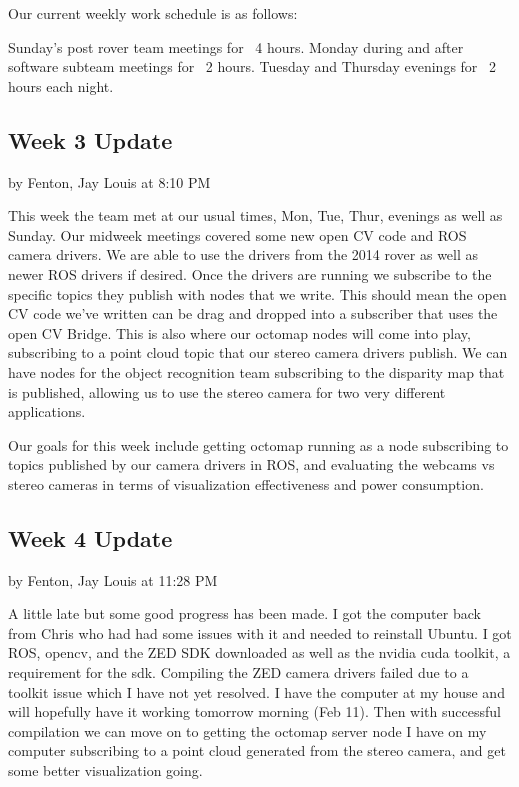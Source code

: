 \documentclass[10pt, oneside,onecolumn]{IEEEtran}
\begin{document}
\begin{titlepage}
Our current weekly work schedule is as follows:

Sunday's post rover team meetings for ~4 hours.
Monday during and after software subteam meetings for ~2 hours.
Tuesday and Thursday evenings for ~2 hours each night. 

\subsection{Week 3 Update}
by Fenton, Jay Louis at 8:10 PM

This week the team met at our usual times, Mon, Tue, Thur, evenings as well as Sunday. Our midweek meetings covered some new open CV code and ROS camera drivers. We are able to use the drivers from the 2014 rover as well as newer ROS drivers if desired. Once the drivers are running we subscribe to the specific topics they publish with nodes that we write. This should mean the open CV code we've written can be drag and dropped into a subscriber that uses the open CV Bridge. This is also where our octomap nodes will come into play, subscribing to a point cloud topic that our stereo camera drivers publish. We can have nodes for the object recognition team subscribing to the disparity map that is published, allowing us to use the stereo camera for two very different applications. 

Our goals for this week include getting octomap running as a node subscribing to topics published by our camera drivers in ROS, and evaluating the webcams vs stereo cameras in terms of visualization effectiveness and power consumption.

\subsection{Week 4 Update}
by Fenton, Jay Louis at 11:28 PM 

A little late but some good progress has been made. I got the computer back from Chris who had had some issues with it and needed to reinstall Ubuntu. I got ROS, opencv, and the ZED SDK downloaded as well as the nvidia cuda toolkit, a requirement for the sdk. Compiling the ZED camera drivers failed due to a toolkit issue which I have not yet resolved. I have the computer at my house and will hopefully have it working tomorrow morning (Feb 11). Then with successful compilation we can move on to getting the octomap server node I have on my computer subscribing to a point cloud generated from the stereo camera, and get some better visualization going. 


\end{titlepage}
\end{document}
